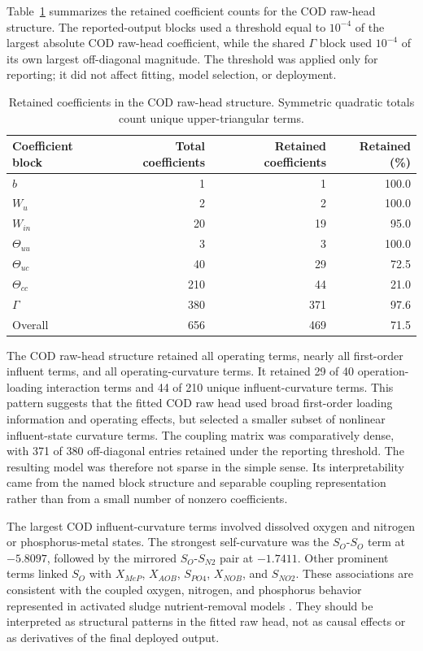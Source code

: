 \documentclass[12pt, twoside]{book}
\begin{document}
Table~\ref{tab:ch3_raw_head_coefficients} summarizes the retained coefficient counts for the COD raw-head
structure. The reported-output blocks used a threshold equal to \(10^{-4}\) of the largest absolute COD
raw-head coefficient, while the shared \(\Gamma\) block used \(10^{-4}\) of its own largest off-diagonal
magnitude. The threshold was applied only for reporting; it did not affect fitting, model selection, or
deployment.

\begin{table}[htbp]
\centering
\caption[Retained COD raw-head coefficients]{Retained coefficients in the COD raw-head structure. Symmetric quadratic totals count unique upper-triangular terms.}
\label{tab:ch3_raw_head_coefficients}
\scriptsize
\setlength{\tabcolsep}{5pt}
\begin{tabular}{lrrr}
\toprule
Coefficient block & Total coefficients & Retained coefficients & Retained (\%) \\
\midrule
\(b\) & 1 & 1 & 100.0 \\
\(W_u\) & 2 & 2 & 100.0 \\
\(W_{in}\) & 20 & 19 & 95.0 \\
\(\Theta_{uu}\) & 3 & 3 & 100.0 \\
\(\Theta_{uc}\) & 40 & 29 & 72.5 \\
\(\Theta_{cc}\) & 210 & 44 & 21.0 \\
\(\Gamma\) & 380 & 371 & 97.6 \\
Overall & 656 & 469 & 71.5 \\
\bottomrule
\end{tabular}
\end{table}

The COD raw-head structure retained all operating terms, nearly all first-order influent terms, and all
operating-curvature terms. It retained 29 of 40 operation-loading interaction terms and 44 of 210 unique
influent-curvature terms. This pattern suggests that the fitted COD raw head used broad first-order loading
information and operating effects, but selected a smaller subset of nonlinear influent-state curvature terms.
The coupling matrix was comparatively dense, with 371 of 380 off-diagonal entries retained under the reporting
threshold. The resulting model was therefore not sparse in the simple sense. Its interpretability came from
the named block structure and separable coupling representation rather than from a small number of nonzero
coefficients.

The largest COD influent-curvature terms involved dissolved oxygen and nitrogen or phosphorus-metal states.
The strongest self-curvature was the \(S_O\)-\(S_O\) term at \(-5.8097\), followed by the mirrored
\(S_O\)-\(S_{N2}\) pair at \(-1.7411\). Other prominent terms linked \(S_O\) with
\(X_{MeP}\), \(X_{AOB}\), \(S_{PO4}\), \(X_{NOB}\), and \(S_{NO2}\). These associations are consistent with
the coupled oxygen, nitrogen, and phosphorus behavior represented in activated sludge nutrient-removal models
\citep{Henze2006,Wentzel1992,Araujo2013}. They should be interpreted as structural patterns in the fitted
raw head, not as causal effects or as derivatives of the final deployed output.
\end{document}
